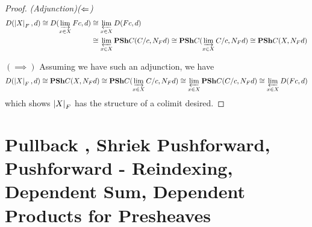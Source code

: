 \documentclass{article}
\begin{document}
\begin{prop}
\end{prop}
\begin{proof}
  
  \textit{(Adjunction)($\Leftarrow$)}
  \begin{align*}
    D(\left\vert X \right\vert_F , d) \cong D(\varinjlim_{x \in X} F c , d)
    &\cong \varprojlim_{x \in X} D(F c , d) \\
    &\cong \varprojlim_{x \in X} \mathbf{PSh} C ( C / c , N_F d)
    \cong \mathbf{PSh} C (\varinjlim_{x \in X} C / c , N_F d)
    \cong \mathbf{PSh} C (X , N_F d)
  \end{align*}

  $(\implies)$ Assuming we have such an adjunction,
  we have 
  \begin{align*}
    D(\left\vert X \right\vert_F , d) \cong \mathbf{PSh} C (X , N_F d)
    \cong \mathbf{PSh} C (\varinjlim_{x \in X} C / c , N_F d)
    \cong \varprojlim_{x \in X} \mathbf{PSh} C ( C / c , N_F d)
    \cong \varprojlim_{x \in X} D(F c , d)
  \end{align*}
  which shows $\left\vert X \right\vert_F$ has the structure of
  a colimit desired.

\end{proof}

\section{Pullback , Shriek Pushforward, Pushforward - 
  Reindexing, Dependent Sum, Dependent Products for Presheaves}
\end{document}
